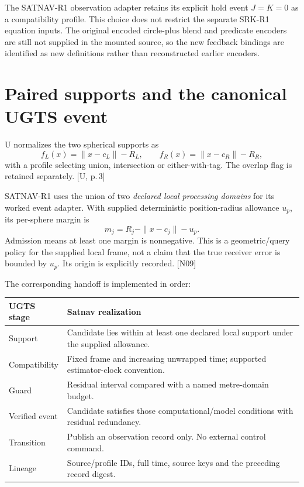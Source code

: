 \documentclass[11pt,a4paper]{article}
\newcommand{\src}[1]{\textcolor{muted}{[U, #1]}}
\newcommand{\dec}[1]{\textcolor{accent}{[N#1]}}
\begin{document}
The SATNAV-R1 observation adapter retains its explicit hold event $J=K=0$ as a
compatibility profile. This choice does not restrict the separate SRK-R1 equation
inputs. The original encoded circle-plus blend and predicate encoders are still
not supplied in the mounted source, so the new feedback bindings are identified
as new definitions rather than reconstructed earlier encoders.
\clearpage

\section{Paired supports and the canonical UGTS event}
U normalizes the two spherical supports as
\begin{equation}
f_L(x)=\|x-c_L\|-R_L,\qquad f_R(x)=\|x-c_R\|-R_R,
\end{equation}
with a profile selecting union, intersection or either-with-tag. The overlap flag
is retained separately. \src{p.\,3}

SATNAV-R1 uses the union of two \emph{declared local processing domains} for its
worked event adapter. With supplied deterministic position-radius allowance $u_p$,
its per-sphere margin is
\begin{equation}
m_j=R_j-\|x-c_j\|-u_p.
\end{equation}
Admission means at least one margin is nonnegative. This is a geometric/query policy
for the supplied local frame, not a claim that the true receiver error is bounded by
$u_p$. Its origin is explicitly recorded. \dec{09}

The corresponding handoff is implemented in order:
\begin{center}
\begin{tabularx}{\textwidth}{@{}P{.24\textwidth}Y@{}}\toprule
\textbf{UGTS stage} & \textbf{Satnav realization}\\\midrule
Support & Candidate lies within at least one declared local support under the supplied allowance.\\
Compatibility & Fixed frame and increasing unwrapped time; supported estimator-clock convention.\\
Guard & Residual interval compared with a named metre-domain budget.\\
Verified event & Candidate satisfies those computational/model conditions with residual redundancy.\\
Transition & Publish an observation record only. No external control command.\\
Lineage & Source/profile IDs, full time, source keys and the preceding record digest.\\\bottomrule
\end{tabularx}
\end{center}
\end{document}
